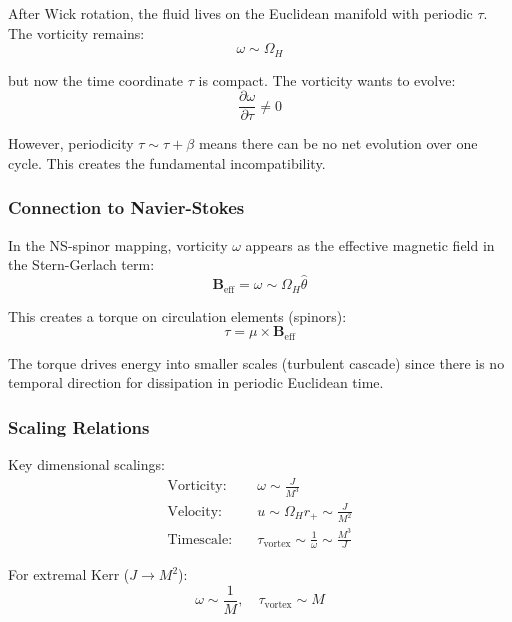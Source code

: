 \documentclass[11pt]{article}
\begin{document}
After Wick rotation, the fluid lives on the Euclidean manifold with periodic $\tau$. The vorticity remains:
\begin{equation}
\omega \sim \Omega_H
\end{equation}

but now the time coordinate $\tau$ is compact. The vorticity wants to evolve:
\begin{equation}
\frac{\partial \omega}{\partial \tau} \neq 0
\end{equation}

However, periodicity $\tau \sim \tau + \beta$ means there can be no net evolution over one cycle. This creates the fundamental incompatibility.

\subsubsection{Connection to Navier-Stokes}

In the NS-spinor mapping, vorticity $\omega$ appears as the effective magnetic field in the Stern-Gerlach term:
\begin{equation}
\mathbf{B}_{\text{eff}} = \omega \sim \Omega_H \hat{\theta}
\end{equation}

This creates a torque on circulation elements (spinors):
\begin{equation}
\tau = \mu \times \mathbf{B}_{\text{eff}}
\end{equation}

The torque drives energy into smaller scales (turbulent cascade) since there is no temporal direction for dissipation in periodic Euclidean time.

\subsubsection{Scaling Relations}

Key dimensional scalings:
\begin{align}
\text{Vorticity:} \quad &\omega \sim \frac{J}{M^3} \\
\text{Velocity:} \quad &u \sim \Omega_H r_+ \sim \frac{J}{M^2} \\
\text{Timescale:} \quad &\tau_{\text{vortex}} \sim \frac{1}{\omega} \sim \frac{M^3}{J}
\end{align}

For extremal Kerr ($J \to M^2$):
\begin{equation}
\omega \sim \frac{1}{M}, \quad \tau_{\text{vortex}} \sim M
\end{equation}
\end{document}
